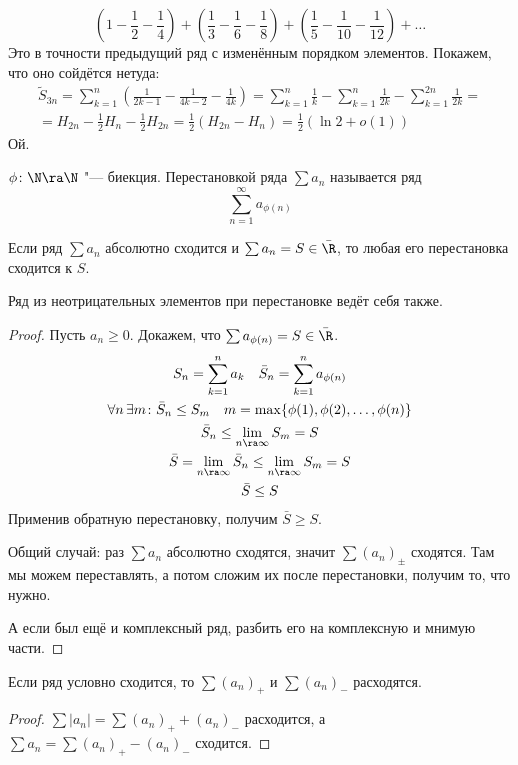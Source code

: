 \begin{exmp}
	\[ (1 - \frac12 - \frac14) + (\frac13 - \frac16 - \frac18) + (\frac15 - \frac1{10} - \frac1{12}) + \dots \]
	Это в точности предыдущий ряд с изменённым порядком элементов.
	Покажем, что оно сойдётся нетуда:
	\begin{gather*}
		\tilde S_{3n}
		= \sum_{k=1}^n \left(\frac1{2k-1} - \frac1{4k-2} - \frac1{4k}\right)
		= \sum_{k=1}^n \frac1k - \sum_{k=1}^n \frac1{2k} - \sum_{k=1}^{2n} \frac1{2k} = \\
		= H_{2n} - \frac12 H_n - \frac12 H_{2n} = \frac12 (H_{2n} - H_n) = \frac12 (\ln 2 + o(1))
	\end{gather*}
	Ой.
\end{exmp}

\begin{Def}
	$\phi\colon \N \ra \N$ "--- биекция.
	Перестановкой ряда $\sum a_n$ называется ряд
	\[ \sum_{n=1}^\infty a_{\phi(n)} \]
\end{Def}

\begin{theorem}
	Если ряд $\sum a_n$ абсолютно сходится и $\sum a_n = S \in \bar \R$, то любая его перестановка сходится к $S$.
\end{theorem}
\begin{Rem}
	Ряд из неотрицательных элементов при перестановке ведёт себя также.
\end{Rem}
\begin{proof}
	Пусть $a_n \ge 0$.
	Докажем, что $\sum a_{\phi(n)} = S \in \bar \R$.
	\begin{gather*}
		S_n = \sum_{k=1}^n a_k \quad \bar S_n = \sum_{k=1}^n a_{\phi(n)} \\
		\forall n\, \exists m\colon \bar S_n \le S_m \quad m = \max\{\phi(1), \phi(2), \dots, \phi(n)\} \\
		\bar S_n \le \lim_{n\ra\infty} S_m = S \\
		\bar S = \lim_{n\ra\infty} \bar S_n \le \lim_{n\ra\infty} S_m = S \\
		\bar S \le S
	\end{gather*}
	Применив обратную перестановку, получим $\bar S \ge S$.

	Общий случай: раз $\sum a_n$ абсолютно сходятся, значит $\sum (a_n)_\pm$ сходятся.
	Там мы можем переставлять, а потом сложим их после перестановки, получим то, что нужно.

	А если был ещё и комплексный ряд, разбить его на комплексную и мнимую части.
\end{proof}

\begin{Rem}
	Если ряд условно сходится, то $\sum (a_n)_+$ и $\sum (a_n)_-$ расходятся.
\end{Rem}
\begin{proof}
	$\sum |a_n| = \sum (a_n)_+ + (a_n)_-$ расходится, а $\sum a_n = \sum (a_n)_+ - (a_n)_-$ сходится.
\end{proof}

